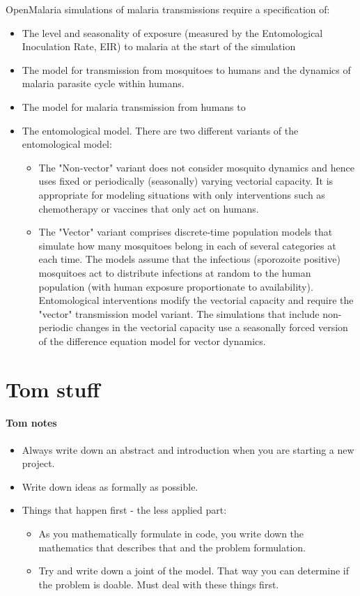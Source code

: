 \documentclass[]{scrartcl}
\begin{document}
OpenMalaria simulations of malaria transmissions require a specification of:
\begin{itemize}
	\item The level and seasonality of exposure (measured by the Entomological Inoculation Rate, EIR) to malaria at the start of the simulation
	\item The model for transmission from mosquitoes to humans and the dynamics of malaria parasite cycle within humans.
	\item The model for malaria transmission from humans to 
	\item The entomological model. There are two different variants of the entomological model:
	\begin{itemize}
    \item The "Non-vector" variant does not consider mosquito dynamics and hence uses fixed or periodically (seasonally) varying vectorial capacity. It is appropriate for modeling situations with only interventions such as chemotherapy or vaccines that only act on humans.
	\item The "Vector" variant comprises discrete-time population models that simulate how many mosquitoes belong in each of several categories at each time. The models assume that the infectious (sporozoite positive) mosquitoes act to distribute infections at random to the human population (with human exposure proportionate to availability). Entomological interventions modify the vectorial capacity and require the "vector" transmission model variant. The simulations that include non-periodic changes in the vectorial capacity use a seasonally forced version of the difference equation model for vector dynamics.
\end{itemize}
\end{itemize}

\section{Tom stuff}

\paragraph*{Tom notes}

\begin{itemize}
	\item Always write down an abstract and introduction when you are starting a new project. 
	\item Write down ideas as formally as possible. 
	\item Things that happen first - the less applied part: 
	\begin{itemize}
		\item As you mathematically formulate in code, you write down the mathematics that describes that and the problem formulation. 
         \item Try and write down a joint of the model. That way you can determine if the problem is doable. Must deal with these things first. 
\end{itemize}
\end{itemize}
\end{document}

